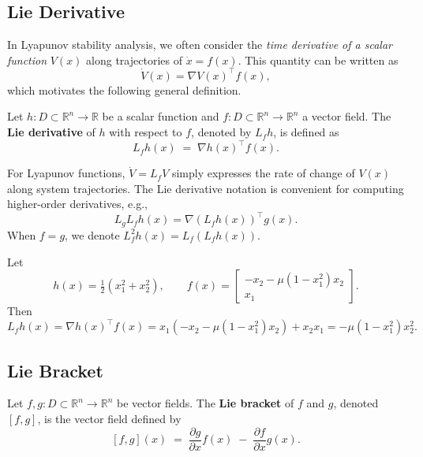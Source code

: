 \subsection{Lie Derivative}

In Lyapunov stability analysis, we often consider the \emph{time derivative of a scalar function}
$V(x)$ along trajectories of $\dot{x} = f(x)$.  
This quantity can be written as
\[
\dot{V}(x) = \nabla V(x)^\top f(x),
\]
which motivates the following general definition.

\begin{definition}\label{def:Lie_derivative}
Let $h : D \subset \mathbb{R}^n \to \mathbb{R}$ be a scalar function and 
$f : D \subset \mathbb{R}^n \to \mathbb{R}^n$ a vector field.  
The \textbf{Lie derivative} of $h$ with respect to $f$, denoted by $L_f h$, is defined as
\begin{equation}\label{eq:Lie_derivative}
L_f h(x) \;=\; \nabla h(x)^\top f(x).
\end{equation}
\end{definition}

\begin{remark}
For Lyapunov functions, $\dot{V} = L_f V$ simply expresses the rate of change of $V(x)$ 
along system trajectories.  
The Lie derivative notation is convenient for computing higher-order derivatives, e.g.,
\[
L_g L_f h(x) = \nabla (L_f h(x))^\top g(x).
\]
When $f = g$, we denote $L_f^2 h(x) = L_f (L_f h(x))$.
\end{remark}

\begin{example}
Let
\[
h(x) = \tfrac{1}{2}(x_1^2 + x_2^2), 
\qquad 
f(x) = 
\begin{bmatrix}
 -x_2 - \mu (1 - x_1^2) x_2 \\
 x_1
\end{bmatrix}.
\]
Then
\[
L_f h(x) = \nabla h(x)^\top f(x) = x_1(-x_2 - \mu(1 - x_1^2)x_2) + x_2 x_1 
= -\mu(1 - x_1^2)x_2^2.
\]
\end{example}

\subsection{Lie Bracket}

\begin{definition}\label{def:Lie_bracket}
Let $f,g : D \subset \mathbb{R}^n \to \mathbb{R}^n$ be vector fields.  
The \textbf{Lie bracket} of $f$ and $g$, denoted $[f,g]$, is the vector field defined by
\begin{equation}\label{eq:Lie_bracket}
[f,g](x) \;=\; \frac{\partial g}{\partial x} f(x) \;-\; \frac{\partial f}{\partial x} g(x).
\end{equation}
\end{definition}

